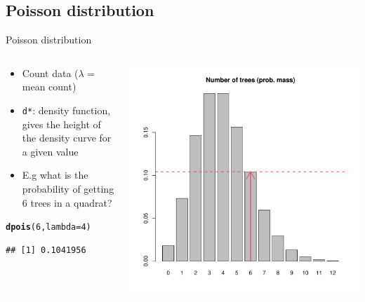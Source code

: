 \documentclass[aspectratio=169]{beamer}\usepackage[]{graphicx}\usepackage[]{color}
\makeatletter
\def\maxwidth{ %
  \ifdim\Gin@nat@width>\linewidth
    \linewidth
  \else
    \Gin@nat@width
  \fi
}
\newcommand{\hlnum}[1]{\textcolor[rgb]{0.686,0.059,0.569}{#1}}%
\newcommand{\hlstd}[1]{\textcolor[rgb]{0.345,0.345,0.345}{#1}}%
\newcommand{\hlkwc}[1]{\textcolor[rgb]{0.333,0.667,0.333}{#1}}%
\newcommand{\hlkwd}[1]{\textcolor[rgb]{0.737,0.353,0.396}{\textbf{#1}}}%
\newenvironment{kframe}{%
 \def\at@end@of@kframe{}%
 \ifinner\ifhmode%
  \def\at@end@of@kframe{\end{minipage}}%
  \begin{minipage}{\columnwidth}%
 \fi\fi%
 \def\FrameCommand##1{\hskip\@totalleftmargin \hskip-\fboxsep
 \colorbox{shadecolor}{##1}\hskip-\fboxsep
     \hskip-\linewidth \hskip-\@totalleftmargin \hskip\columnwidth}%
 \MakeFramed {\advance\hsize-\width
   \@totalleftmargin\z@ \linewidth\hsize
   \@setminipage}}%
 {\par\unskip\endMakeFramed%
 \at@end@of@kframe}
\newenvironment{knitrout}{}{} %
\makeatother
\begin{document}
\subsection{Poisson distribution}
\begin{frame}[fragile]{Poisson distribution}
\begin{columns}
  \begin{column}{0.5\textwidth}
  \begin{itemize}
    \item Count data ($\lambda$ = mean count)
    \item \texttt{d*}: density function, gives the height of the density curve for a given value
    \item E.g what is the probability of getting 6 trees in a quadrat?
  \end{itemize}
\begin{knitrout}\scriptsize
{}\color{fgcolor}\begin{kframe}
\begin{alltt}
\hlkwd{dpois}\hlstd{(}\hlnum{6}\hlstd{,}\hlkwc{lambda}\hlstd{=}\hlnum{4}\hlstd{)}
\end{alltt}
\begin{verbatim}
## [1] 0.1041956
\end{verbatim}
\end{kframe}
\end{knitrout}
  \end{column}
  \begin{column}{0.5\textwidth}
\begin{knitrout}\scriptsize
{}\color{fgcolor}
\includegraphics[width=\maxwidth]{figure/unnamed-chunk-2-1} 

\end{knitrout}
  \end{column}
\end{columns}
\end{frame}
\end{document}
